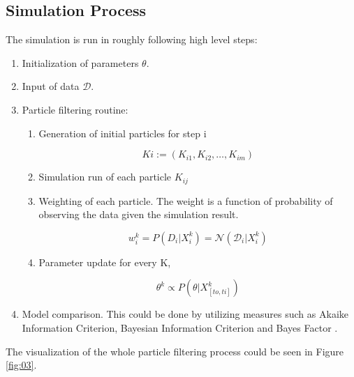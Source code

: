 \documentclass{bioinfo}
\begin{document}
\subsection{Simulation Process}

The simulation is run in roughly following high level steps:

\begin{enumerate}
\item Initialization of parameters $\theta$.
\item Input of data $\mathcal{D}$.
\item Particle filtering routine:

\begin{enumerate}
\item Generation of initial particles for step i

\begin{equation}
Ki := (K_{i1}, K_{i2}, \dots, K_{im})\label{eq:11}
\end{equation}

\item Simulation run of each particle $K_{ij}$
\item Weighting of each particle. The weight is a function of probability of observing the data given the simulation result.

\begin{equation}
w_i^k = P(D_i | X_i^k) = \mathcal{N}(\mathcal{D}_i | X_i^k)\label{eq:12}
\end{equation}

\item Parameter update for every K,

\begin{equation}
\theta^k \propto P(\theta | X^k_{[to, ti]})\label{eq:13}
\end{equation}

\end{enumerate}

\item Model comparison. This could be done by utilizing measures such as Akaike Information Criterion, Bayesian Information Criterion and Bayes Factor \citep{PosadaBuckley14, Bozdogan87}.

\end{enumerate}

The visualization of the whole particle filtering process could be seen in Figure \ref{fig:03}.
\end{document}

